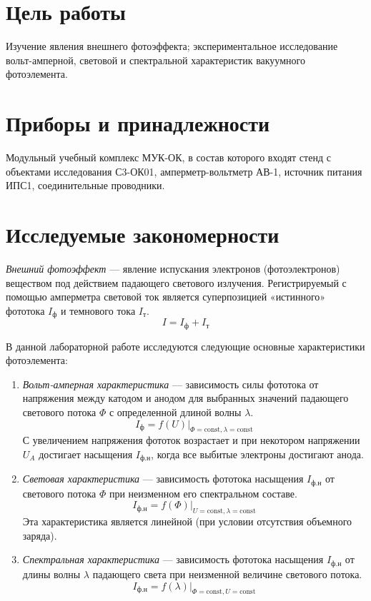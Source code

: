 \section*{Цель работы}
Изучение явления внешнего фотоэффекта; экспериментальное исследование вольт-амперной, световой и спектральной характеристик вакуумного фотоэлемента.

\section*{Приборы и принадлежности}
Модульный учебный комплекс МУК-ОК, в состав которого входят стенд с объектами исследования С3-ОК01, амперметр-вольтметр АВ-1, источник питания ИПС1, соединительные проводники.

\section*{Исследуемые закономерности}
\textit{Внешний фотоэффект} — явление испускания электронов (фотоэлектронов) веществом под действием падающего светового излучения. Регистрируемый с помощью амперметра световой ток является суперпозицией «истинного» фототока $I_\text{ф}$ и темнового тока $I_\text{т}$.
$$ I = I_\text{ф} + I_\text{т} $$

В данной лабораторной работе исследуются следующие основные характеристики фотоэлемента:
\begin{enumerate}
    \item \textit{Вольт-амперная характеристика} — зависимость силы фототока от напряжения между катодом и анодом для выбранных значений падающего светового потока $\Phi$ с определенной длиной волны $\lambda$.
          $$ I_\text{ф} = f(U)|_{\Phi=\text{const}, \lambda=\text{const}} $$
          С увеличением напряжения фототок возрастает и при некотором напряжении $U_A$ достигает насыщения $I_{\text{ф.н}}$, когда все выбитые электроны достигают анода.

    \item \textit{Световая характеристика} — зависимость фототока насыщения $I_{\text{ф.н}}$ от светового потока $\Phi$ при неизменном его спектральном составе.
          $$ I_{\text{ф.н}} = f(\Phi)|_{U=\text{const}, \lambda=\text{const}} $$
          Эта характеристика является линейной (при условии отсутствия объемного заряда).

    \item \textit{Спектральная характеристика} — зависимость фототока насыщения $I_{\text{ф.н}}$ от длины волны $\lambda$ падающего света при неизменной величине светового потока.
          $$ I_{\text{ф.н}} = f(\lambda)|_{\Phi=\text{const}, U=\text{const}} $$
\end{enumerate}

